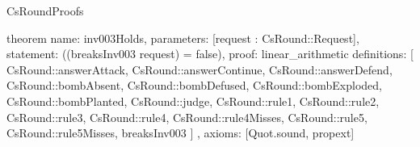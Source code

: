 \begin{lexlean}{CsRoundProofs}
\begin{semanticmodule}
theorem{
  name: inv003Holds,
  parameters: [request : CsRound::Request],
  statement: ((breaksInv003 request) = false),
  proof: linear_arithmetic{
    definitions: [
      CsRound::answerAttack,
      CsRound::answerContinue,
      CsRound::answerDefend,
      CsRound::bombAbsent,
      CsRound::bombDefused,
      CsRound::bombExploded,
      CsRound::bombPlanted,
      CsRound::judge,
      CsRound::rule1,
      CsRound::rule2,
      CsRound::rule3,
      CsRound::rule4,
      CsRound::rule4Misses,
      CsRound::rule5,
      CsRound::rule5Misses,
      breaksInv003
    ]
  },
  axioms: [Quot.sound, propext]
}
\end{semanticmodule}
\end{lexlean}
